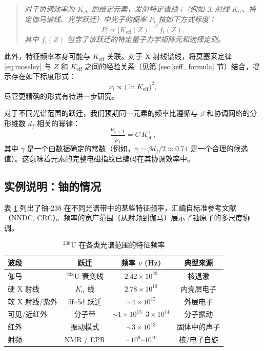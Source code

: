 \documentclass[11pt,a4paper]{article}
\begin{document}
	\begin{quote}
		\emph{对于协调效率为 \(K_{\mathrm{eff}}\) 的给定元素，发射特定谱线 \(i\)（例如 X 射线 \(K_\alpha\)、特定伽马谱线、光学跃迁）中光子的概率 \(P_i\) 按如下方式标度：}
		\begin{equation}
			P_i \propto \bigl[K_{\mathrm{eff}}(Z)\bigr]^{-\beta} \, f_i(Z),
			\label{eq:prob_scaling}
		\end{equation}
		\emph{其中 \(f_i(Z)\) 包含了该跃迁的特定量子力学矩阵元和选择定则。}
	\end{quote}
	
	此外，特征频率本身可能与 \(K_{\mathrm{eff}}\) 关联。对于 X 射线谱线，将莫塞莱定律 \eqref{eq:moseley} 与 \(Z\) 和 \(K_{\mathrm{eff}}\) 之间的经验关系（见第 \ref{sec:keff_formula} 节）结合，提示存在如下标度形式：
	\begin{equation}
		\nu_i \propto \bigl(\ln K_{\mathrm{eff}}\bigr)^2,
		\label{eq:freq_scaling}
	\end{equation}
	尽管更精确的形式有待进一步研究。
	
	对于不同光谱范围的跃迁，我们预期同一元素的频率比遵循与 \(\beta\) 和协调网络的分形维数 \(d_f\) 相关的幂律：
	\begin{equation}
		\frac{\nu_{i+1}}{\nu_i} = C \, K_{\mathrm{eff}}^{\gamma},
		\label{eq:ratio_scaling}
	\end{equation}
	其中 \(\gamma\) 是一个由数据确定的常数（例如，\(\gamma = \beta d_f/2 \approx 0.74\) 是一个合理的候选值）。这意味着元素的完整电磁指纹已编码在其协调效率中。
	
	\subsection{实例说明：铀的情况}
	
	表 \ref{tab:uranium_spectrum} 列出了铀-238 在不同光谱带中的某些特征频率，汇编自标准参考文献（NNDC, CRC）。频率的宽广范围（从射频到伽马）展示了铀原子的多尺度协调。
	
	\begin{table}[htbp]
		\centering
		\caption{\(^{238}\mathrm{U}\) 在各类光谱范围的特征频率}
		\label{tab:uranium_spectrum}
		\begin{tabular}{@{}lccc@{}}
			\toprule
			\textbf{波段} & \textbf{跃迁} & \textbf{频率 \(\nu\) (Hz)} & \textbf{典型来源} \\
			\midrule
			伽马 & \(^{238}\mathrm{U}\) 衰变线 & \(2.42\times10^{20}\) & 核退激 \\
			硬 X 射线 & \(K_\alpha\) 线 & \(2.78\times10^{19}\) & 内壳层电子 \\
			软 X 射线/紫外 & 5f–5d 跃迁 & \(\sim 4\times10^{15}\) & 外层电子 \\
			可见/近红外 & 分子带 & \(\sim 1\times10^{15}\)–\(3\times10^{14}\) & 分子振动 \\
			红外 & 振动模式 & \(\sim 3\times10^{13}\) & 固体中的声子 \\
			射频 & NMR / EPR & \(\sim 10^9\)–\(10^{10}\) & 核/电子自旋 \\
			\bottomrule
		\end{tabular}
	\end{table}
	
\end{document}
